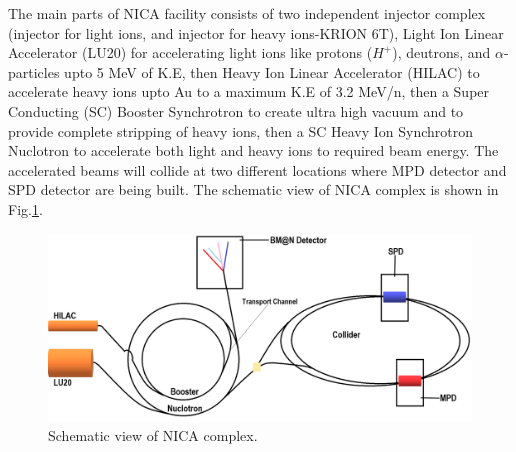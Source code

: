 \documentclass[12pt]{article}
\begin{document}
The main parts of NICA facility consists of two independent injector complex (injector for light ions, and injector for heavy ions-KRION 6T), Light Ion Linear Accelerator (LU20) for accelerating light ions like protons ($H^{+}$), deutrons, and $\alpha$-particles upto 5 MeV of K.E, then Heavy Ion Linear Accelerator (HILAC) to accelerate heavy ions upto Au to a maximum K.E of 3.2 MeV/n, then a Super Conducting (SC) Booster Synchrotron to create ultra high vacuum and to provide complete stripping of heavy ions, then a SC Heavy Ion Synchrotron Nuclotron to accelerate both light and heavy ions to required beam energy. The accelerated beams will collide at two different locations where MPD detector and SPD detector are being built. The schematic view of NICA complex is shown in Fig.\ref{Schematic view of NICA complex.}.

\begin{figure}[h]
\centering
\includegraphics[scale=0.3]{NICA_Collider.png}
\caption{Schematic view of NICA complex.}
\label{Schematic view of NICA complex.}
\end{figure}
 


\end{document}
